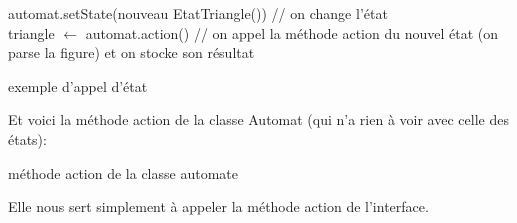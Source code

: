 \documentclass[../../Rapport RayTracer]{subfiles}
\begin{document}
 \begin{algorithm}[H]
	\DontPrintSemicolon
	automat.setState(nouveau EtatTriangle()) // on change l'état
	\hfill\\
	triangle $\gets$ automat.action() // on appel la méthode action du nouvel état (on parse la figure) et on stocke son résultat

	\caption{exemple d'appel d'état}
	\label{exempleState}
\end{algorithm}

Et voici la méthode action de la classe Automat (qui n'a rien à voir avec celle des états):
 
  \begin{algorithm}[H]
	\DontPrintSemicolon
	\caption{méthode action de la classe automate}
	\label{exempleState}
\end{algorithm}
 
Elle nous sert simplement à appeler la méthode action de l'interface.
\end{document}
